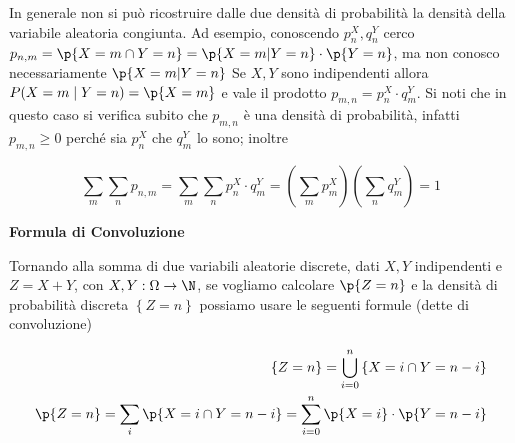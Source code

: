 In generale non si pu\`o  ricostruire dalle due densit\`a di probabilit\`a  la
densit\`a della variabile aleatoria congiunta. Ad esempio, conoscendo $
p^X_n,q^Y_n $ cerco $ p_{n,m}  = \p{X = m \cap Y = n} = \p{X = m | Y = n} \cdot
\p{Y=n} $, ma non conosco necessariamente $\p{X = m | Y = n}$ Se $ X,Y $ sono
indipendenti allora $ P(X=m \mid Y=n) = \p{X=m} $ e vale il prodotto $ p_{m,n} =
p^X_n \cdot q^Y_m $. Si noti che in questo caso si verifica subito che  $
p_{m,n} $  \`e  una densit\`a  di probabilit\`a, infatti $ p_{m,n}\ge0 $
perch\'e sia $p^X_n$  che $q^Y_m $ lo sono; inoltre

\begin{equation*}
    \sum_{m}\sum_{n} p_{n,m} = \sum_{m}\sum_{n} p^X_n \cdot q^Y_m
 = \left( \sum_{m} p^X_m \right) \left( \sum_{n} q^Y_m \right) = 1
\end{equation*}



\begin{defn}
    \textbf{Formula di Convoluzione}

    Tornando alla somma di due variabili aleatorie discrete, dati $ X,Y $
    indipendenti e $ Z = X + Y $, con $ X,Y : \Omega \to \N $, se vogliamo
    calcolare $ \p{Z = n} $ e la densit\`a  di probabilit\`a  discreta $
    \left\{Z = n\right\} $ possiamo usare le seguenti formule (dette di
    convoluzione)

    \begin{equation*}
    \begin{aligned}
    \left\{Z = n\right\} = \bigcup_{i=0}^{n} \left\{X = i \cap Y = n - i \right\} \\
    \p{Z=n} = \sum_{i} \p{X = i \cap Y = n-i} = \sum_{i = 0}^{n} \p{X=i} \cdot \p{Y=n-i}
    \end{aligned}
    \end{equation*}
\end{defn}


